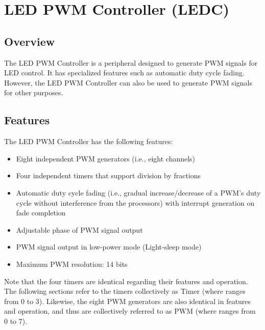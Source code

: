 \documentclass[main\_\_EN.tex]{subfiles}
\begin{document}

\ifglobal
\else
    {\let\clearpage\relax \listoftodos}
    \tableofcontents
\fi



\hypertarget{ledpwm}{}
\chapter{LED PWM Controller (LEDC)}
\label{mod:ledpwm}

\section{Overview}


The LED PWM Controller is a peripheral designed to generate PWM signals for LED control. It has specialized features such as automatic duty cycle fading. However, the LED PWM Controller can also be used to generate PWM signals for other purposes.

\section{Features}
The LED PWM Controller has the following features:
\begin{itemize}
    \item Eight independent PWM generators (i.e., eight channels)
    \item Four independent timers that support division by fractions
    \item Automatic duty cycle fading (i.e., gradual increase/decrease of a PWM's duty cycle without interference from the processors) with interrupt generation on fade completion
    \item Adjustable phase of PWM signal output
    \item PWM signal output in low-power mode (Light-sleep mode)
    \item Maximum PWM resolution: 14 bits
\end{itemize}

Note that the four timers are identical regarding their features and operation. The following sections refer to the timers collectively as Timer (where  ranges from 0 to 3). Likewise, the eight PWM generators are also identical in features and operation, and thus are collectively referred to as PWM (where  ranges from 0 to 7).
\end{document}
